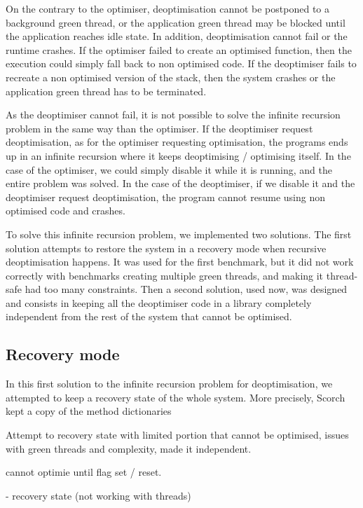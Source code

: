 \documentclass[a4paper,12pt,twoside]{../includes/ThesisStyle}
\begin{document}
On the contrary to the optimiser, deoptimisation cannot be postponed to a background green thread, or the application green thread may be blocked until the application reaches idle state. In addition, deoptimisation cannot fail or the runtime crashes. If the optimiser failed to create an optimised function, then the execution could simply fall back to non optimised code. If the deoptimiser fails to recreate a non optimised version of the stack, then the system crashes or the application green thread has to be terminated.


As the deoptimiser cannot fail, it is not possible to solve the infinite recursion problem in the same way than the optimiser. If the deoptimiser request deoptimisation, as for the optimiser requesting optimisation, the programs ends up in an infinite recursion where it keeps deoptimising / optimising itself. In the case of the optimiser, we could simply disable it while it is running, and the entire problem was solved. In the case of the deoptimiser, if we disable it and the deoptimiser request deoptimisation, the program cannot resume using non optimised code and crashes. 

To solve this infinite recursion problem, we implemented two solutions. The first solution attempts to restore the system in a recovery mode when recursive deoptimisation happens. It was used for the first benchmark, but it did not work correctly with benchmarks creating multiple green threads, and making it thread-safe had too many constraints. Then a second solution, used now, was designed and consists in keeping all the deoptimiser code in a library completely independent from the rest of the system that cannot be optimised.

\subsection{Recovery mode}

In this first solution to the infinite recursion problem for deoptimisation, we attempted to keep a recovery state of the whole system. More precisely, Scorch kept a copy of the method dictionaries

 Attempt to recovery state with limited portion that cannot be optimised, issues with green threads and complexity, made it independent.

cannot optimie until flag set / reset.

- recovery state (not working with threads)
\end{document}
